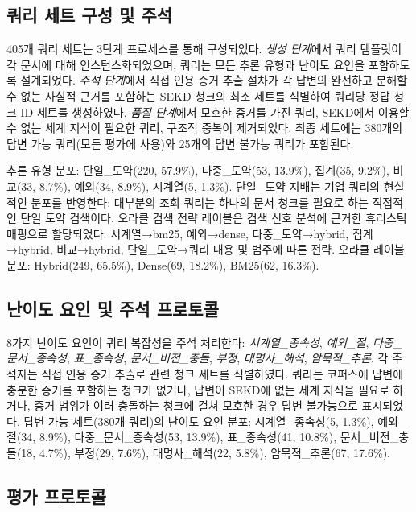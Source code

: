 \documentclass[11pt, a4paper]{article}
\begin{document}
\subsection{쿼리 세트 구성 및 주석}

405개 쿼리 세트는 3단계 프로세스를 통해 구성되었다. \emph{생성 단계}에서 쿼리 템플릿이 각 문서에 대해 인스턴스화되었으며, 쿼리는 모든 추론 유형과 난이도 요인을 포함하도록 설계되었다. \emph{주석 단계}에서 직접 인용 증거 추출 절차가 각 답변의 완전하고 분해할 수 없는 사실적 근거를 포함하는 SEKD 청크의 최소 세트를 식별하여 쿼리당 정답 청크 ID 세트를 생성하였다. \emph{품질 단계}에서 모호한 증거를 가진 쿼리, SEKD에서 이용할 수 없는 세계 지식이 필요한 쿼리, 구조적 중복이 제거되었다. 최종 세트에는 380개의 답변 가능 쿼리(모든 평가에 사용)와 25개의 답변 불가능 쿼리가 포함된다.

추론 유형 분포: 단일\_도약(220, 57.9\%), 다중\_도약(53, 13.9\%), 집계(35, 9.2\%), 비교(33, 8.7\%), 예외(34, 8.9\%), 시계열(5, 1.3\%). 단일\_도약 지배는 기업 쿼리의 현실적인 분포를 반영한다: 대부분의 조회 쿼리는 하나의 문서 청크를 필요로 하는 직접적인 단일 도약 검색이다. 오라클 검색 전략 레이블은 검색 신호 분석에 근거한 휴리스틱 매핑으로 할당되었다: 시계열→bm25, 예외→dense, 다중\_도약→hybrid, 집계→hybrid, 비교→hybrid, 단일\_도약→쿼리 내용 및 범주에 따른 전략. 오라클 레이블 분포: Hybrid(249, 65.5\%), Dense(69, 18.2\%), BM25(62, 16.3\%).

\subsection{난이도 요인 및 주석 프로토콜}

8가지 난이도 요인이 쿼리 복잡성을 주석 처리한다: \emph{시계열\_종속성}, \emph{예외\_절}, \emph{다중\_문서\_종속성}, \emph{표\_종속성}, \emph{문서\_버전\_충돌}, \emph{부정}, \emph{대명사\_해석}, \emph{암묵적\_추론}. 각 주석자는 직접 인용 증거 추출로 관련 청크 세트를 식별하였다. 쿼리는 코퍼스에 답변에 충분한 증거를 포함하는 청크가 없거나, 답변이 SEKD에 없는 세계 지식을 필요로 하거나, 증거 범위가 여러 충돌하는 청크에 걸쳐 모호한 경우 답변 불가능으로 표시되었다. 답변 가능 세트(380개 쿼리)의 난이도 요인 분포: 시계열\_종속성(5, 1.3\%), 예외\_절(34, 8.9\%), 다중\_문서\_종속성(53, 13.9\%), 표\_종속성(41, 10.8\%), 문서\_버전\_충돌(18, 4.7\%), 부정(29, 7.6\%), 대명사\_해석(22, 5.8\%), 암묵적\_추론(67, 17.6\%).

\subsection{평가 프로토콜}
\end{document}
